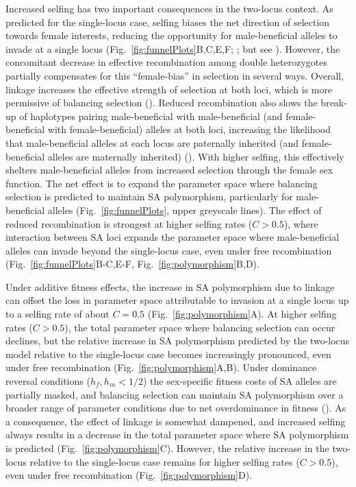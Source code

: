 \documentclass{article}
\begin{document}
Increased selfing has two important consequences in the two-locus context. As predicted for the single-locus case, selfing biases the net direction of selection towards female interests, reducing the opportunity for male-beneficial alleles to invade at a single locus (Fig.~\ref{fig:funnelPlots}B,C,E,F; \citealt{Charlesworth1978, JordanConn2014}; but see \citealt{Tazzyman2015}). However, the concomitant decrease in effective recombination among double heterozygotes partially compensates for this ``female-bias'' in selection in several ways. Overall, linkage increases the effective strength of selection at both loci, which is more permissive of balancing selection (\citealt{Patten2010}). Reduced recombination also slows the break-up of haplotypes pairing male-beneficial with male-beneficial (and female-beneficial with female-beneficial) alleles at both loci, increasing the likelihood that male-beneficial alleles at each locus are paternally inherited (and female-beneficial alleles are maternally inherited) (\citealt{Patten2010, Ubeda2010}). With higher selfing, this effectively shelters male-beneficial alleles from increased selection through the female sex function. The net effect is to expand the parameter space where balancing selection is predicted to maintain SA polymorphism, particularly for male-beneficial alleles (Fig.~\ref{fig:funnelPlots}, upper greyscale lines). The effect of reduced recombination is strongest at higher selfing rates ($C > 0.5$), where interaction between SA loci expands the parameter space where male-beneficial alleles can invade beyond the single-locus case, even under free recombination (Fig.~\ref{fig:funnelPlots}B-C,E-F, Fig.~\ref{fig:polymorphism}B,D). 

Under additive fitness effects, the increase in SA polymorphism due to linkage can offset the loss in parameter space attributable to invasion at a single locus up to a selfing rate of about $C = 0.5$ (Fig.~\ref{fig:polymorphism}A). At higher selfing rates ($C > 0.5$), the total parameter space where balancing selection can occur declines, but the relative increase in SA polymorphism predicted by the two-locus model relative to the single-locus case becomes increasingly pronounced, even under free recombination (Fig.~\ref{fig:polymorphism}A,B). Under dominance reversal conditions ($h_f,h_m < 1/2$) the sex-specific fitness costs of SA alleles are partially masked, and balancing selection can maintain SA polymorphism over a broader range of parameter conditions due to net overdominance in fitness (\citealt{ConnClark2012, ConnClark2014}). As a consequence, the effect of linkage is somewhat dampened, and increased selfing always results in a decrease in the total parameter space where SA polymorphism is predicted (Fig.~\ref{fig:polymorphism}C). However, the relative increase in the two-locus relative to the single-locus case remains for higher selfing rates ($C > 0.5$), even under free recombination (Fig.~\ref{fig:polymorphism}D).
\end{document}
